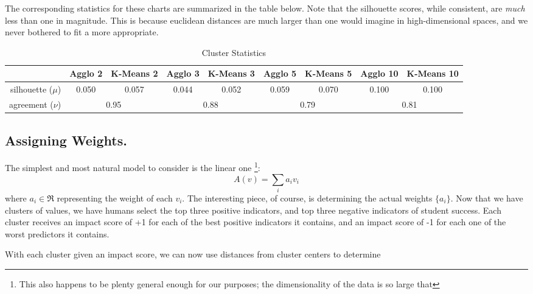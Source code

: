\documentclass[paper.tex]{subfiles}
\begin{document}
	The corresponding statistics for these charts are summarized in the table below. Note that the silhouette scores, while consistent, are \emph{much} less than one in magnitude. This is because euclidean distances are much larger than one would imagine in high-dimensional spaces, and we never bothered to fit a more appropriate. 
	
	\begin{table}[!h]
		\caption{Cluster Statistics}
		\def\arraystretch{1.2}%
		\begin{tabular}{r||cc|cc|cc|cc|}
			 &\small Agglo 2 &\small K-Means 2 &\small Agglo 3 &\small K-Means 3 &\small Agglo 5 &\small  K-Means 5 &\small Agglo 10 &\small K-Means 10\\\hline
		\small silhouette ($\mu$)& 0.050 & 0.057 & 0.044 & 0.052 & 0.059 & 0.070 & 0.100 & 0.100 \\
		\small agreement ($\nu$)  & \multicolumn{2}{|c|}{0.95} & \multicolumn{2}{|c|}{0.88} & \multicolumn{2}{|c|}{0.79}& \multicolumn{2}{|c|}{0.81}\\\hline
		\end{tabular}		\label{t1}
	\end{table}
		
	\subsection{Assigning Weights.}
	The simplest and most natural model to consider is the linear one \footnote{This also happens to be plenty general enough for our purposes; the dimensionality of the data is so large that }:
	\[A(v) = \sum_i a_i v_i \]
	where $a_i \in \Re$ representing the weight of each $v_i$. The interesting piece, of course, is determining the actual weights $\{a_i\}$. Now that we have clusters of values, we have humans select the top three positive indicators, and top three negative indicators of student success. Each cluster receives an impact score of +1 for each of the best positive indicators it contains, and an impact score of -1 for each one of the worst predictors it contains. 
	
	With each cluster given an impact score, we can now use distances from cluster centers to determine 
	
	
	
\end{document}
